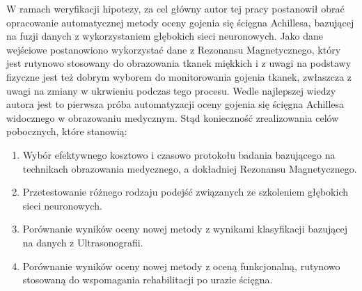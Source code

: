 W ramach weryfikacji hipotezy, za cel główny autor tej pracy postanowił obrać opracowanie automatycznej metody oceny gojenia się ścięgna Achillesa, bazującej na fuzji danych z wykorzystaniem głębokich sieci neuronowych. Jako dane wejściowe postanowiono wykorzystać dane z Rezonansu Magnetycznego, który jest rutynowo stosowany do obrazowania tkanek miękkich i z uwagi na podstawy fizyczne jest też dobrym wyborem do monitorowania gojenia tkanek, zwłaszcza z uwagi na zmiany w ukrwieniu podczas tego procesu. Wedle najlepszej wiedzy autora jest to pierwsza próba automatyzacji oceny gojenia się ścięgna Achillesa widocznego w obrazowaniu medycznym. Stąd konieczność zrealizowania celów pobocznych, które stanowią:
\begin{enumerate}
	\item Wybór efektywnego kosztowo i czasowo protokołu badania bazującego na technikach obrazowania medycznego, a dokładniej Rezonansu Magnetycznego.
	\item Przetestowanie różnego rodzaju podejść związanych ze szkoleniem głębokich sieci neuronowych.
	\item Porównanie wyników oceny nowej metody z wynikami klasyfikacji bazującej na danych z Ultrasonografii.
	\item Porównanie wyników oceny nowej metody z oceną funkcjonalną, rutynowo stosowaną do wspomagania rehabilitacji po urazie ścięgna.
\end{enumerate}

